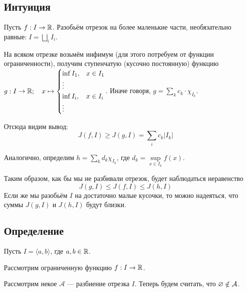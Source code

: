 \documentclass[a4paper]{report}
\begin{document}
    \subsection{Интуиция}
    Пусть $f: I \rightarrow \mathbb{R}$.
    Разобьём отрезок на более маленькие части, необязательно равные: $I = \bigsqcup\limits_i I_i$.

    На всяком отрезке возьмём инфимум (для этого потребуем от функции ограниченности), получим ступенчатую (кусочно постоянную) функцию $g: I \rightarrow \mathbb{R}; \quad x \mapsto \begin{cases}\inf I_1,& x \in I_1 \\ \vdots \\\inf I_i,& x \in I_i\\ \vdots\end{cases}$.
    Иначе говоря, $g = \sum\limits_{k}c_k\cdot \chi_{I_k}$.

    Отсюда видим вывод: \[J(f, I) \ge J(g, I) = \sum\limits_{i}c_k |I_k|\]

    Аналогично, определим $h = \sum\limits_{k}d_k \chi_{I_k}$, где $d_k = \sup\limits_{x \in I_k}f(x)$.

    Таким образом, как бы мы не разбивали отрезок, будет наблюдаться неравенство
    \[J(g, I) \le J(f, I) \le J(h, I)\]
    Если же мы разобьём $I$ на достаточно малые кусочки, то можно надеяться, что суммы $J(g, I)$ и $J(h, I)$ будут близки.

    \subsection{Определение}
    Пусть $I = \langle a, b \rangle$, где $a, b \in \mathbb{R}$.

    Рассмотрим ограниченную функцию $f: I \rightarrow \mathbb{R}$.


    Рассмотрим некое $\mathcal{A}$ --- разбиение отрезка $I$.
    Теперь будем считать, что $\varnothing \notin \mathcal{A}$.
\end{document}

